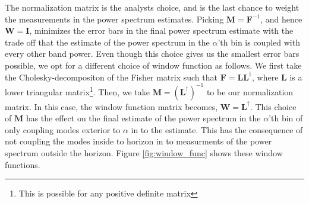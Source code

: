 \documentclass[twocolumn,numberedappendix]{emulateapj} \shorttitle{PSA64}
\begin{document}
%
The normalization matrix is the analysts choice, and is the last chance to
weight the measurements in the power spectrum estimates. Picking $\mathbf{M} =
\mathbf{F}^{-1}$, and hence $\mathbf{W} = \mathbf{I}$, minimizes the error bars
in the final power spectrum estimate with the trade off that the estimate of the
power spectrum in the $\alpha$'th bin is coupled with every other band power.
Even though this choice gives us the smallest error bars possible, we opt for a
different choice of window function as follows. We first take the
Cholesky-decompositon of the Fisher matrix such that $\mathbf{F} =
\mathbf{L}\mathbf{L}^{\dagger}$, where $\mathbf{L}$ is a lower triangular
matrix\footnote{This is possible for any positive definite matrix}. Then, we
take ${\mathbf{M}} = (\mathbf{L}^{\dagger})^{-1}$ to be our normalization
matrix. In this case, the window function matrix becomes,
$\mathbf{W}=\mathbf{L}^{\dagger}$. This choice of $\mathbf{M}$ has the effect on
the final estimate of the power spectrum in the $\alpha$'th bin of only coupling
modes exterior to $\alpha$ in to the estimate.  This has the consequence of not
coupling the modes inside to horizon in to measurments of the power spectrum
outside the horizon. Figure \ref{fig:window_func} shows these window
functions.
\end{document}
